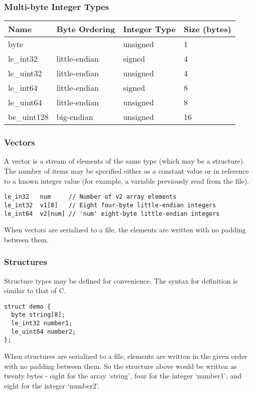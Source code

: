 \documentclass[10pt]{article}
\begin{document}
{\subsubsection{Multi-byte Integer Types}
\begin{center}
\begin{tabular}{l l l l}
\hline
\textbf{Name} & \textbf{Byte Ordering} & \textbf{Integer Type} & \textbf{Size (bytes)} \\
\hline
byte & & unsigned & 1 \\
le\_int32 & little-endian & signed & 4 \\
le\_uint32 & little-endian & unsigned & 4 \\
le\_int64 & little-endian & signed & 8 \\
le\_uint64 & little-endian & unsigned & 8 \\
be\_uint128 & big-endian & unsigned & 16 \\
\end{tabular}
\end{center}

\subsubsection{Vectors}
A vector is a stream of elements of the same type (which may be a structure).
The number of items may be specified either as a constant value or in reference to a known integer value (for
example, a variable previously read from the file).

\begin{verbatim}
le_in32   num     // Number of v2 array elements
le_int32  v1[8]   // Eight four-byte little-endian integers
le_int64  v2[num] // 'num' eight-byte little-endian integers
\end{verbatim}

When vectors are serialized to a file, the elements are written with no padding between them.

\subsubsection{Structures}
Structure types may be defined for convenience.
The syntax for definition is similar to that of C.

\begin{verbatim}
struct demo {
  byte string[8];
  le_int32 number1;
  le_uint64 number2;
};
\end{verbatim}

When structures are serialized to a file, elements are written in the given order with no padding between them.
So the structure above would be written as twenty bytes - eight for the array `string', four for the integer `number1',
and eight for the integer `number2'.

}
\end{document}
